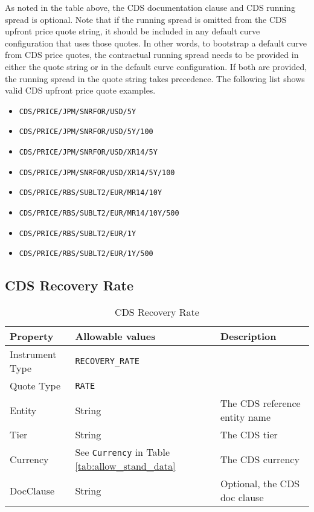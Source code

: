 As noted in the table above, the CDS documentation clause and CDS running spread is optional. Note that if the running spread is omitted from the CDS upfront price quote string, it should be included in any default curve configuration that uses those quotes. In other words, to bootstrap a default curve from CDS price quotes, the contractual running spread needs to be provided in either the quote string or in the default curve configuration. If both are provided, the running spread in the quote string takes precedence. The following list shows valid CDS upfront price quote examples.
\begin{itemize}
\item \lstinline!CDS/PRICE/JPM/SNRFOR/USD/5Y!
\item \lstinline!CDS/PRICE/JPM/SNRFOR/USD/5Y/100!
\item \lstinline!CDS/PRICE/JPM/SNRFOR/USD/XR14/5Y!
\item \lstinline!CDS/PRICE/JPM/SNRFOR/USD/XR14/5Y/100!
\item \lstinline!CDS/PRICE/RBS/SUBLT2/EUR/MR14/10Y!
\item \lstinline!CDS/PRICE/RBS/SUBLT2/EUR/MR14/10Y/500!
\item \lstinline!CDS/PRICE/RBS/SUBLT2/EUR/1Y!
\item \lstinline!CDS/PRICE/RBS/SUBLT2/EUR/1Y/500!
\end{itemize}

\subsection{CDS Recovery Rate}
\label{md:cds_recovery_rate_quote}

\begin{table}[H]
\centering
  \begin{tabular}{|p{3cm}|p{3.5cm}|p{7cm}|}
    \hline
    {\bf Property} & {\bf Allowable values} & {\bf Description} \\ \hline
    Instrument Type & \lstinline!RECOVERY_RATE! & \\ \hline
    Quote Type & \lstinline!RATE! & \\ \hline
    Entity & String & The CDS reference entity name \\ \hline
    Tier & String & The CDS tier \\ \hline
    Currency & See \lstinline!Currency! in Table \ref{tab:allow_stand_data} & The CDS currency\\ \hline
    DocClause & String & Optional, the CDS doc clause \\ \hline
  \end{tabular}
  \caption{CDS Recovery Rate}
  \label{tab:cdsrecovery_quote}
\end{table}

